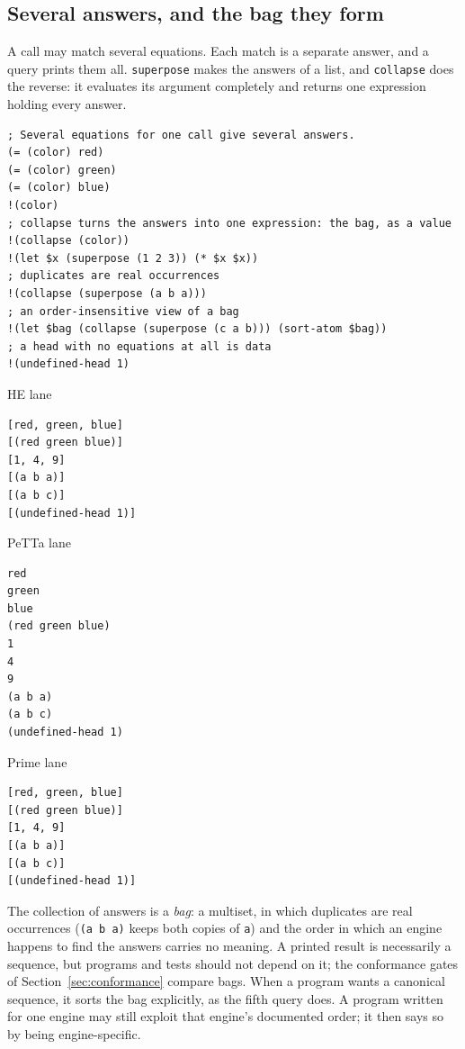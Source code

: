 \documentclass[11pt]{article}
\newcommand{\code}[1]{\texttt{#1}}
\newcommand{\outhead}[1]{{\footnotesize\sffamily #1}\par\vspace{1pt}}
\begin{document}
\subsection{Several answers, and the bag they form}
\label{sec:tut-nondet}

A call may match several equations.  Each match is a separate answer, and a
query prints them all.  \code{superpose} makes the answers of a list, and
\code{collapse} does the reverse: it evaluates its argument completely and
returns one expression holding every answer.

\begin{lstlisting}[style=metta,caption={Several answers, and the bag they form},label={lst:t02}]
; Several equations for one call give several answers.
(= (color) red)
(= (color) green)
(= (color) blue)
!(color)
; collapse turns the answers into one expression: the bag, as a value
!(collapse (color))
!(let $x (superpose (1 2 3)) (* $x $x))
; duplicates are real occurrences
!(collapse (superpose (a b a)))
; an order-insensitive view of a bag
!(let $bag (collapse (superpose (c a b))) (sort-atom $bag))
; a head with no equations at all is data
!(undefined-head 1)
\end{lstlisting}
\noindent\begin{minipage}[t]{0.32\textwidth}
\outhead{HE lane}
\begin{lstlisting}[style=out]
[red, green, blue]
[(red green blue)]
[1, 4, 9]
[(a b a)]
[(a b c)]
[(undefined-head 1)]
\end{lstlisting}
\end{minipage}\hfill
\begin{minipage}[t]{0.32\textwidth}
\outhead{PeTTa lane}
\begin{lstlisting}[style=out]
red
green
blue
(red green blue)
1
4
9
(a b a)
(a b c)
(undefined-head 1)
\end{lstlisting}
\end{minipage}\hfill
\begin{minipage}[t]{0.32\textwidth}
\outhead{Prime lane}
\begin{lstlisting}[style=out]
[red, green, blue]
[(red green blue)]
[1, 4, 9]
[(a b a)]
[(a b c)]
[(undefined-head 1)]
\end{lstlisting}
\end{minipage}

\noindent
The collection of answers is a \emph{bag}: a multiset, in which duplicates are
real occurrences (\code{(a b a)} keeps both copies of \code{a}) and the order
in which an engine happens to find the answers carries no meaning.  A printed
result is necessarily a sequence, but programs and tests should not depend on
it; the conformance gates of Section~\ref{sec:conformance} compare bags.  When
a program wants a canonical sequence, it sorts the bag explicitly, as the
fifth query does.  A program written for one engine may still exploit that
engine's documented order; it then says so by being engine-specific.
\end{document}

